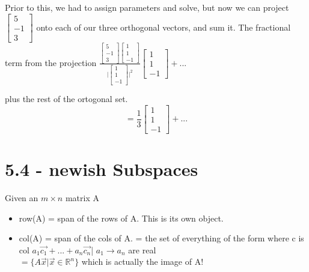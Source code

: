\documentclass[10pt, twocolumn]{report}
\begin{document}
Prior to this, we had to assign parameters and solve, but now we can project $\begin{bmatrix} 5 \\ -1 \\ 3 \end{bmatrix}$ onto each of our three orthogonal vectors, and sum it. The fractional term from the projection $\frac{\begin{bmatrix} 5 \\ -1 \\ 3 \end{bmatrix} \begin{bmatrix} 1 \\ 1 \\ -1 \end{bmatrix}}{\bigg|\begin{bmatrix} 1 \\ 1 \\ -1 \end{bmatrix}\bigg|^2} \begin{bmatrix} 1 \\ 1 \\ -1 \end{bmatrix} + ...$

plus the rest of the ortogonal set.
$$= \frac{1}{3} \begin{bmatrix} 1 \\ 1 \\ -1 \end{bmatrix} + ...$$

\section{5.4 - newish Subspaces}
Given an $m\times n$ matrix A
\begin{itemize}
  \item row(A) = span of the rows of A. This is its own object.
  \item col(A) = span of the cols of A. = the set of everything of the form where c is col {$a_1 \vec{c_1} + ... + a_n \vec{c_n}$| $a_1 \to a_n$ are real} \\ $=\{A\vec{x}| \vec{x} \in \mathbb{R}^n\}$ which is actually the image of A!
\end{itemize}
\end{document}
